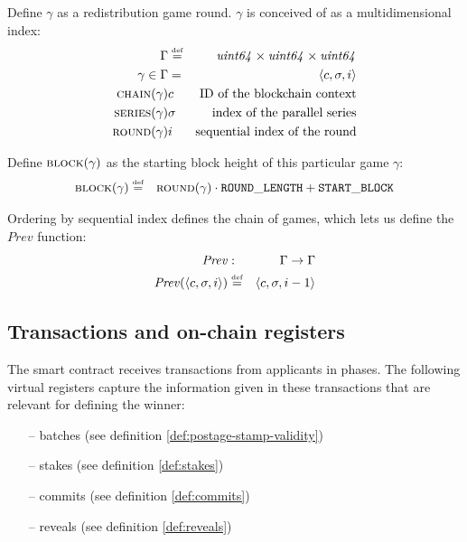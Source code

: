 \begin{definition}

\label{def:redistribution-game-round} 
Define $\gamma$ as a redistribution game round.  $\gamma$ is conceived of as a multidimensional index:
%
\begin{eqnarray}
\Gamma&\overset{\textrm{\tiny def}}{=}&\mathit{uint64}\times\mathit{uint64}\times\mathit{uint64}\\
\gamma\in\Gamma&=&\langle c,\sigma,i\rangle\\
\textsc{chain}(\gamma)&c&\text{ID of the blockchain context}\\
\textsc{series}(\gamma)&\sigma&\text{index of the parallel series}\\
\textsc{round}(\gamma)&i&\text{sequential index of the round}
\end{eqnarray}

Define $\textsc{block}(\gamma)$ as the starting block height of this particular game $\gamma$:
%
\begin{eqnarray}
\textsc{block}(\gamma)&\overset{\textrm{\tiny def}}{=}&\textsc{round}(\gamma)\cdot \mathtt{ROUND\_LENGTH}+\mathtt{START\_BLOCK}
\end{eqnarray}

Ordering by sequential index defines the chain of games, which lets us define the $\mathit{Prev}$ function:
%
\begin{eqnarray}
\mathit{Prev}&:&\Gamma\to\Gamma\\
\mathit{Prev}(\langle c,\sigma,i\rangle)&\overset{\textrm{\tiny def}}{=}&\langle c,\sigma,i-1\rangle
\end{eqnarray}
\end{definition}

\subsection{Transactions and on-chain registers}

The smart contract receives transactions from applicants in phases. The following virtual registers capture the information given in these transactions that are relevant for defining the winner:
\begin{itemize}[noitemsep]
\item[--] batches (see definition \ref{def:postage-stamp-validity})
\item[--] stakes (see definition \ref{def:stakes})
\item[--] commits (see definition \ref{def:commits})
\item[--] reveals (see definition \ref{def:reveals})
\end{itemize}

